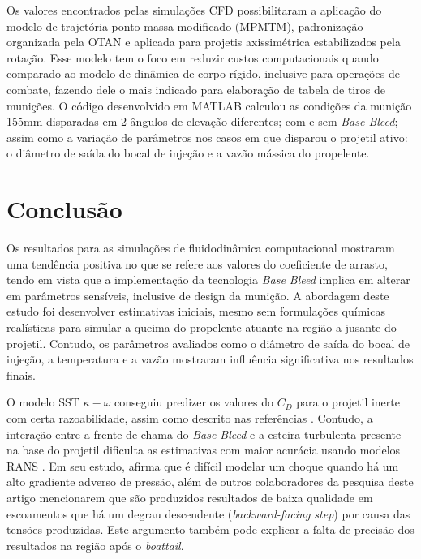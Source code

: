 Os valores encontrados pelas simulações CFD possibilitaram a aplicação do modelo de trajetória ponto-massa modificado (MPMTM), padronização organizada pela OTAN \cite{stanag4355} e aplicada para projetis axissimétrica estabilizados pela rotação. Esse modelo tem o foco em reduzir custos computacionais quando comparado ao modelo de dinâmica de corpo rígido, inclusive para operações de combate, fazendo dele o mais indicado para elaboração de tabela de tiros de munições. O código desenvolvido em MATLAB\textregistered{} \cite{ThallyoENCIT2022,Thallyo2022} calculou as condições da munição 155mm disparadas em 2 ângulos de elevação diferentes; com e sem \textit{Base Bleed}; assim como a variação de parâmetros nos casos em que disparou o projetil ativo: o diâmetro de saída do bocal de injeção e a vazão mássica do propelente. 

\section{Conclusão}

Os resultados para as simulações de fluidodinâmica computacional mostraram uma tendência positiva no que se refere aos valores do coeficiente de arrasto, tendo em vista que a implementação da tecnologia \textit{Base Bleed} implica em alterar em parâmetros sensíveis, inclusive de design da munição. A abordagem deste estudo foi desenvolver estimativas iniciais, mesmo sem formulações químicas realísticas para simular a queima do propelente atuante na região a jusante do projetil. Contudo, os parâmetros avaliados como o diâmetro de saída do bocal de injeção, a temperatura e a vazão mostraram influência significativa nos resultados finais.

O modelo SST $\kappa-\omega$ conseguiu predizer os valores do $C_D$ para o projetil inerte com certa razoabilidade, assim como descrito nas referências \cite{Mahmoud2009,nicolas-perez_accuracy_2017}. Contudo, a interação entre a frente de chama do \textit{Base Bleed} e a esteira turbulenta presente na base do projetil dificulta as estimativas com maior acurácia usando modelos RANS \cite{nicolas-perez_accuracy_2017}. Em seu estudo, \citeauthor{Spalart1992} afirma que é difícil modelar um choque quando há um alto gradiente adverso de pressão, além de outros colaboradores da pesquisa deste artigo mencionarem que são produzidos resultados de baixa qualidade em escoamentos que há um degrau descendente (\textit{backward-facing step}) por causa das tensões produzidas. Este argumento também pode explicar a falta de precisão dos resultados na região após o \textit{boattail}.

